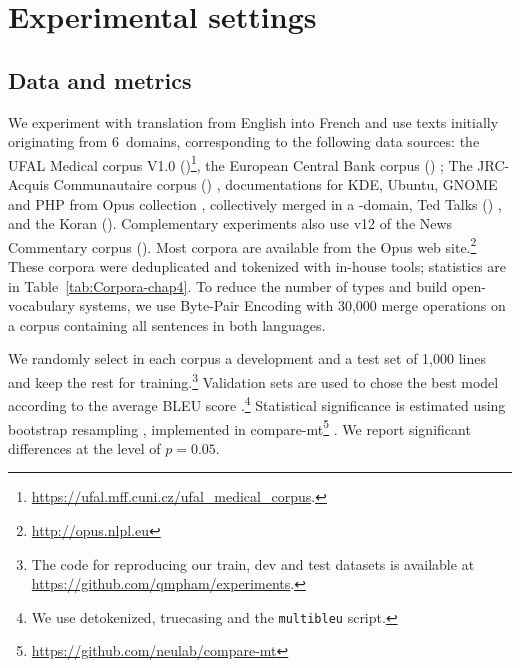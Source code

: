 \section{Experimental settings \label{sec:experiments-chap4}}

\subsection{Data and metrics \label{ssec:corpora-chap4}}

We experiment with translation from English into French and use texts initially originating from 6~domains, corresponding to the following data sources: the UFAL Medical corpus V1.0 ()\footnote{\url{https://ufal.mff.cuni.cz/ufal_medical_corpus}. }, the European Central Bank corpus () \citep{Tiedemann12parallel}; The JRC-Acquis Communautaire corpus () \citep{Steinberger06acquis}, documentations for KDE, Ubuntu, GNOME and PHP from Opus collection \citep{Tiedemann09news}, collectively merged in a -domain, Ted Talks () \citep{Cettolo12wit}, and the Koran (). Complementary experiments also use v12 of the News Commentary corpus (). Most corpora are available from the Opus web site.\footnote{\url{http://opus.nlpl.eu}} These corpora were deduplicated and tokenized with in-house tools; statistics are in Table~\ref{tab:Corpora-chap4}. To reduce the number of types and build open-vocabulary systems, we use Byte-Pair Encoding \citep{Sennrich16neural} with 30,000 merge operations on a corpus containing all sentences in both languages.

We randomly select in each corpus a development and a test set of 1,000 lines and keep the rest for training.\footnote{The code for reproducing our train, dev and test datasets is available at \url{https://github.com/qmpham/experiments}.} Validation sets are used to chose the best model according to the average BLEU score \citep{Papineni02bleu}.\footnote{We use detokenized, truecasing and the \texttt{multibleu} script.} Statistical significance is estimated using bootstrap resampling \citep{Koehn04statistical}, implemented in compare-mt\footnote{\url{https://github.com/neulab/compare-mt}} \citep{Neubig19compare-mt}. We report significant differences at the level of $p=0.05$.

